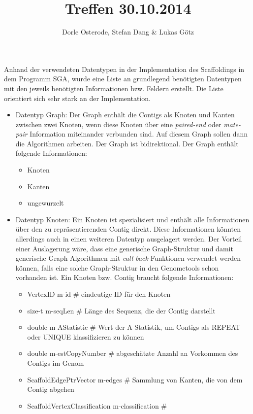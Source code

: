 \documentclass[a4paper,10pt,parskip]{scrartcl}
\title{Treffen 30.10.2014}
\author{Dorle Osterode, Stefan Dang \& Lukas Götz}
\begin{document}
\maketitle{}

Anhand der verwendeten Datentypen in der Implementation des
Scaffoldings in dem Programm SGA, wurde eine Liste an grundlegend
benötigten Datentypen mit den jeweils benötigten Informationen
bzw. Feldern erstellt. Die Liste orientiert sich sehr stark an der
Implementation.

\begin{itemize}
\item Datentyp Graph: Der Graph enthält die Contigs als Knoten und
  Kanten zwischen zwei Knoten, wenn diese Knoten über eine
  \textit{paired-end} oder \textit{mate-pair} Information miteinander
  verbunden sind. Auf diesem Graph sollen dann die Algorithmen
  arbeiten. Der Graph ist bidirektional. Der Graph enthält folgende
  Informationen:
  \begin{itemize}
  \item Knoten
  \item Kanten
  \item ungewurzelt
  \end{itemize}
\item Datentyp Knoten: Ein Knoten ist spezialisiert und enthält alle
  Informationen über den zu repräsentierenden Contig direkt. Diese
  Informationen könnten allerdings auch in einen weiteren Datentyp
  ausgelagert werden. Der Vorteil einer Auslagerung wäre, dass eine
  generische Graph-Struktur und damit generische Graph-Algorithmen mit
  \textit{call-back}-Funktionen verwendet werden können, falls eine
  solche Graph-Struktur in den Genometools schon vorhanden ist. Ein
  Knoten bzw. Contig braucht folgende Informationen:
  \begin{itemize}
  \item VertexID m-id \# eindeutige ID für den Knoten
  \item size-t m-seqLen \# Länge des Sequenz, die der Contig darstellt
  \item double m-AStatistic \# Wert der A-Statistik, um Contigs als
    REPEAT oder UNIQUE klassifizieren zu können
  \item double m-estCopyNumber \# abgeschätzte Anzahl an Vorkommen des
    Contigs im Genom
  \item ScaffoldEdgePtrVector m-edges \# Sammlung von Kanten, die von
    dem Contig abgehen
  \item ScaffoldVertexClassification m-classification \#

\end{itemize}
\end{itemize}
\end{document}
